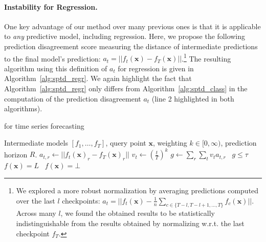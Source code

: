 \paragraph{Instability for Regression.} One key advantage of our method over many previous ones is that it is applicable to \emph{any} predictive model, including regression. Here, we propose the following prediction disagreement score measuring the distance of intermediate predictions to the final model's prediction: $a_t = ||f_t (\bm{x}) - f_T (\bm{x})||$.\footnote{We explored a more robust normalization by averaging predictions computed over the last $l$ checkpoints: $a_t = ||f_t (\bm{x}) - \frac{1}{n}\sum_{c \in \{T-l, T-l+1, \ldots, T \}} f_c (\bm{x})||$. Across many $l$, we found the obtained results to be statistically indistinguishable from the results obtained by normalizing w.r.t. the last checkpoint $f_T$.} The resulting algorithm using this definition of $a_t$ for regression is given in Algorithm~\ref{alg:sptd_regr}. We again highlight the fact that Algorithm~\ref{alg:sptd_regr} only differs from Algorithm~\ref{alg:sptd_class} in the computation of the prediction disagreement $a_t$ (line 2 highlighted in both algorithms).

\begin{algorithm}[t]
    \caption{\sptd for time series forecasting}\label{alg:sptd_ts}
    \begin{algorithmic}[1]
    \Require Intermediate models $[f_1,\ldots,f_T]$, query point $\bm{x}$, weighting $k \in [0,\infty)$, prediction horizon $R$. 
            \State $a_{t,r} \gets ||f_{t}(\bm{x})_r - f_{T}(\bm{x})_r||$
        \EndFor
        \State $v_t \gets (\frac{t}{T})^k$
    \EndFor
\State $g \gets \sum_r\sum_{t} v_t a_{t,r}$
\State \algorithmicif\ $g \leq \tau$ \algorithmicthen\ $f(\bm{x}) = L$ \algorithmicelse\ $f(\bm{x}) = \bot$
    \end{algorithmic}
\end{algorithm}

